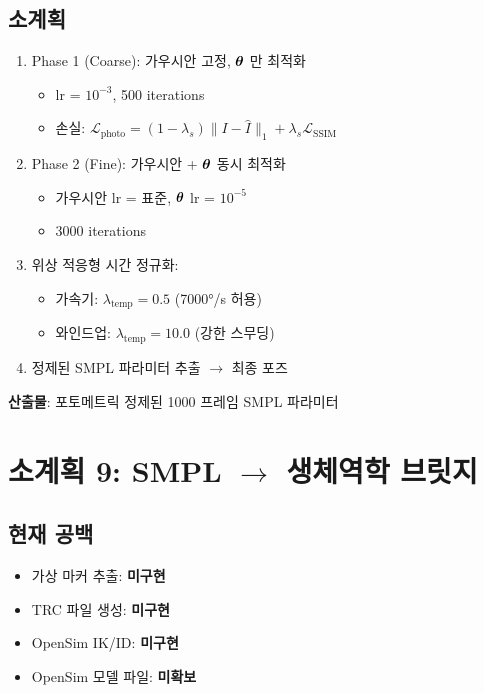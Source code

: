 \documentclass[11pt, a4paper]{report}
\begin{document}
\subsection{소계획}
\begin{pipelinebox}[title={SP-8: 포토메트릭 포즈 정제 루프}]
\begin{enumerate}
\item Phase 1 (Coarse): 가우시안 고정, $\bm{\theta}$ 만 최적화
  \begin{itemize}
  \item lr = $10^{-3}$, 500 iterations
  \item 손실: $\mathcal{L}_{\text{photo}} = (1-\lambda_s)\|I - \hat{I}\|_1 + \lambda_s \mathcal{L}_{\text{SSIM}}$
  \end{itemize}
\item Phase 2 (Fine): 가우시안 + $\bm{\theta}$ 동시 최적화
  \begin{itemize}
  \item 가우시안 lr = 표준, $\bm{\theta}$ lr = $10^{-5}$
  \item 3000 iterations
  \end{itemize}
\item 위상 적응형 시간 정규화:
  \begin{itemize}
  \item 가속기: $\lambda_{\text{temp}} = 0.5$ (7000°/s 허용)
  \item 와인드업: $\lambda_{\text{temp}} = 10.0$ (강한 스무딩)
  \end{itemize}
\item 정제된 SMPL 파라미터 추출 $\to$ 최종 포즈
\end{enumerate}
\textbf{산출물}: 포토메트릭 정제된 1000 프레임 SMPL 파라미터
\end{pipelinebox}


\section{소계획 9: SMPL $\to$ 생체역학 브릿지}
\label{sec:sp9}

\subsection{현재 공백}
\begin{itemize}
\item 가상 마커 추출: \textbf{미구현}
\item TRC 파일 생성: \textbf{미구현}
\item OpenSim IK/ID: \textbf{미구현}
\item OpenSim 모델 파일: \textbf{미확보}
\end{itemize}
\end{document}
